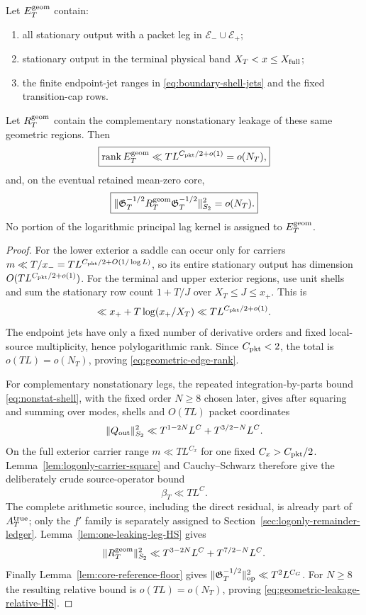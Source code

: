 \begin{proposition}
\label{prop:geometric-edge-ledger}
Let $E_T^{\rm geom}$ contain:
\begin{enumerate}[label=(\roman*)]
\item all stationary output with a packet leg in
$\mathcal E_-\cup\mathcal E_+$;
\item stationary output in the terminal physical band
$X_T<x\le X_{\rm full}$;
\item the finite endpoint-jet ranges in \eqref{eq:boundary-shell-jets} and the
fixed transition-cap rows.
\end{enumerate}
Let $R_T^{\rm geom}$ contain the complementary nonstationary leakage of these
same geometric regions.  Then
\begin{equation}
\boxed{
\operatorname{rank} E_T^{\rm geom}
\ll T L^{C_{\rm pkt}/2+o(1)}=o(N_T),
}
\label{eq:geometric-edge-rank}
\end{equation}
and, on the eventual retained mean-zero core,
\begin{equation}
\boxed{
\|\mathfrak G_T^{-1/2}R_T^{\rm geom}\mathfrak G_T^{-1/2}\|_{S_2}^2=o(N_T).
}
\label{eq:geometric-leakage-relative-HS}
\end{equation}
No portion of the logarithmic principal lag kernel is assigned to
$E_T^{\rm geom}$.
\end{proposition}

\begin{proof}
For the lower exterior a saddle can occur only for carriers
$m\ll T/x_-=T L^{C_{\rm pkt}/2+O(1/\log L)}$, so its entire stationary output
has dimension $O(TL^{C_{\rm pkt}/2+o(1)})$.  For the terminal and upper
exterior regions, use unit shells and sum the stationary row count
$1+T/J$ over $X_T\le J\le x_+$.  This is
\[
\ll x_++T\log(x_+/X_T)
\ll T L^{C_{\rm pkt}/2+o(1)}.
\]
The endpoint jets have only a fixed number of derivative orders and fixed
local-source multiplicity, hence polylogarithmic rank.  Since
$C_{\rm pkt}<2$, the total is $o(TL)=o(N_T)$, proving
\eqref{eq:geometric-edge-rank}.

For complementary nonstationary legs, the repeated integration-by-parts bound
\eqref{eq:nonstat-shell}, with the fixed order $N\ge8$ chosen later, gives after
squaring and summing over modes, shells and $O(TL)$ packet coordinates
\[
\|Q_{\rm out}\|_{S_2}^2
\ll T^{1-2N}L^C+T^{3/2-N}L^C.
\]
On the full exterior carrier range $m\ll TL^{C_x}$ for one fixed
$C_x>C_{\rm pkt}/2$.  Lemma~\ref{lem:logonly-carrier-square} and
Cauchy--Schwarz therefore give the deliberately crude source-operator bound
\[
\beta_T\ll TL^C.
\]
The complete arithmetic source, including the direct residual, is already part
of $A_T^{\rm true}$; only the $f'$ family is separately assigned to
Section~\ref{sec:logonly-remainder-ledger}.  Lemma~\ref{lem:one-leaking-leg-HS}
gives
\[
\|R_T^{\rm geom}\|_{S_2}^2
\ll T^{3-2N}L^C+T^{7/2-N}L^C.
\]
Finally Lemma~\ref{lem:core-reference-floor} gives
$\|\mathfrak G_T^{-1/2}\|_{\operatorname{op}}^2\ll T^2L^{C_G}$.  For $N\ge8$ the resulting relative
bound is $o(TL)=o(N_T)$, proving
\eqref{eq:geometric-leakage-relative-HS}.
\end{proof}

